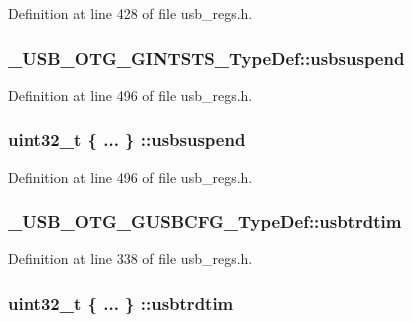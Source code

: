 Definition at line 428 of file usb\-\_\-regs.\-h.

\hypertarget{group___u_s_b___o_t_g___d_r_i_v_e_r_gaa87e3d039cbe1bef55795ef737c3069d}{
\subsubsection[{usbsuspend}]{ \-\_\-\-U\-S\-B\-\_\-\-O\-T\-G\-\_\-\-G\-I\-N\-T\-S\-T\-S\-\_\-\-Type\-Def\-::usbsuspend}}\label{group___u_s_b___o_t_g___d_r_i_v_e_r_gaa87e3d039cbe1bef55795ef737c3069d}


Definition at line 496 of file usb\-\_\-regs.\-h.

\hypertarget{group___u_s_b___o_t_g___d_r_i_v_e_r_ga3c69be470d458db770f6889da5337a35}{
\subsubsection[{usbsuspend}]{\setlength{\rightskip}{0pt plus 5cm}uint32\-\_\-t \{ ... \} \-::usbsuspend}}\label{group___u_s_b___o_t_g___d_r_i_v_e_r_ga3c69be470d458db770f6889da5337a35}


Definition at line 496 of file usb\-\_\-regs.\-h.

\hypertarget{group___u_s_b___o_t_g___d_r_i_v_e_r_gabf63456dfc37163f24032f4315bf5422}{
\subsubsection[{usbtrdtim}]{ \-\_\-\-U\-S\-B\-\_\-\-O\-T\-G\-\_\-\-G\-U\-S\-B\-C\-F\-G\-\_\-\-Type\-Def\-::usbtrdtim}}\label{group___u_s_b___o_t_g___d_r_i_v_e_r_gabf63456dfc37163f24032f4315bf5422}


Definition at line 338 of file usb\-\_\-regs.\-h.

\hypertarget{group___u_s_b___o_t_g___d_r_i_v_e_r_ga7197a23a3bc8053766223a3dab3c94ba}{
\subsubsection[{usbtrdtim}]{\setlength{\rightskip}{0pt plus 5cm}uint32\-\_\-t \{ ... \} \-::usbtrdtim}}\label{group___u_s_b___o_t_g___d_r_i_v_e_r_ga7197a23a3bc8053766223a3dab3c94ba}


